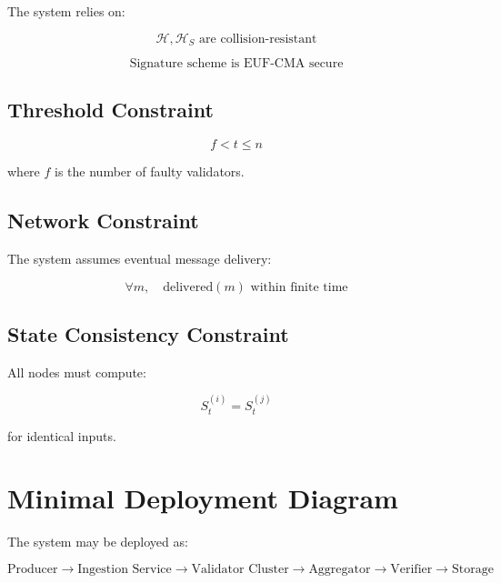 The system relies on:

\begin{equation}
\mathcal{H}, \mathcal{H}_S \text{ are collision-resistant}
\end{equation}

\begin{equation}
\text{Signature scheme is EUF-CMA secure}
\end{equation}

\subsection{Threshold Constraint}

\begin{equation}
f < t \leq n
\end{equation}

where $f$ is the number of faulty validators.

\subsection{Network Constraint}

The system assumes eventual message delivery:

\begin{equation}
\forall m, \quad \text{delivered}(m) \text{ within finite time}
\end{equation}

\subsection{State Consistency Constraint}

All nodes must compute:

\begin{equation}
S_t^{(i)} = S_t^{(j)}
\end{equation}

for identical inputs.

\section{Minimal Deployment Diagram}

The system may be deployed as:

\begin{equation}
\text{Producer} \rightarrow \text{Ingestion Service} \rightarrow \text{Validator Cluster} \rightarrow \text{Aggregator} \rightarrow \text{Verifier} \rightarrow \text{Storage}
\end{equation}

